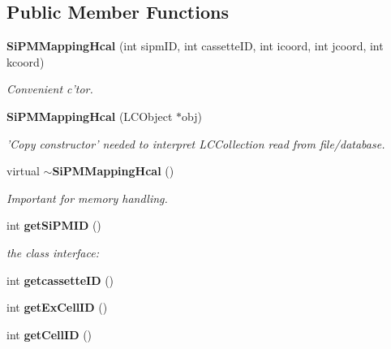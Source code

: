 \subsection*{Public Member Functions}
\begin{DoxyCompactItemize}
\item 
{\bf Si\-P\-M\-Mapping\-Hcal} (int sipm\-I\-D, int cassette\-I\-D, int icoord, int jcoord, int kcoord)\label{classCALICE_1_1SiPMMappingHcal_ae2765c68cb961dfc57d5d9ad5dbd2490}

\begin{DoxyCompactList}\small\item\em Convenient c'tor. \end{DoxyCompactList}\item 
{\bf Si\-P\-M\-Mapping\-Hcal} (L\-C\-Object $\ast$obj)\label{classCALICE_1_1SiPMMappingHcal_ab59441ec2da70fd03254187e96de4fc8}

\begin{DoxyCompactList}\small\item\em 'Copy constructor' needed to interpret L\-C\-Collection read from file/database. \end{DoxyCompactList}\item 
virtual {\bf $\sim$\-Si\-P\-M\-Mapping\-Hcal} ()\label{classCALICE_1_1SiPMMappingHcal_a8164d7985b5b1d0feca49629168dfdd0}

\begin{DoxyCompactList}\small\item\em Important for memory handling. \end{DoxyCompactList}\item 
int {\bf get\-Si\-P\-M\-I\-D} ()\label{classCALICE_1_1SiPMMappingHcal_ab0a627ff9ea7889c099a010f68a68048}

\begin{DoxyCompactList}\small\item\em the class interface\-: \end{DoxyCompactList}\item 
int {\bfseries getcassette\-I\-D} ()\label{classCALICE_1_1SiPMMappingHcal_a3a828d20006a04488b21cfb3bd23f1bb}

\item 
int {\bfseries get\-Ex\-Cell\-I\-D} ()\label{classCALICE_1_1SiPMMappingHcal_a51e789afa8b332823ee3466931b4c41e}

\item 
int {\bfseries get\-Cell\-I\-D} ()\label{classCALICE_1_1SiPMMappingHcal_a51767a9933267022ef380180d2ff8e31}


\end{DoxyCompactItemize}
